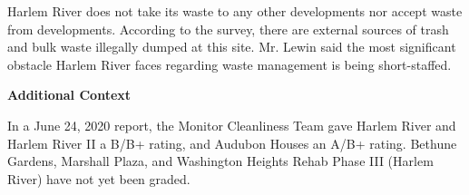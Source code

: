 Harlem River does not take its waste to any other developments nor accept waste from developments. According to the survey, there are external sources of trash and bulk waste illegally dumped at this site. Mr. Lewin said the most significant obstacle Harlem River faces regarding waste management is being short-staffed.

\textbf{Additional Context}

  

In a June 24, 2020 report, the Monitor Cleanliness Team gave Harlem River and Harlem River II a B/B+ rating, and Audubon Houses an A/B+ rating. Bethune Gardens, Marshall Plaza, and Washington Heights Rehab Phase III (Harlem River) have not yet been graded.  

 